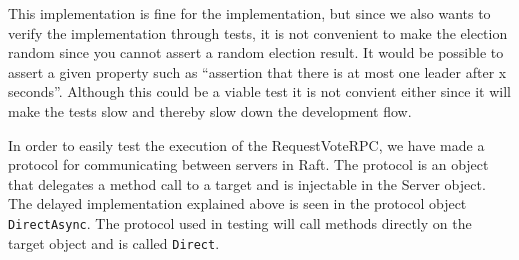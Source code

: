 This implementation is fine for the implementation, but since we also wants to verify the implementation through tests, it is not convenient to make the election random since you cannot assert a random election result. It would be possible to assert a given property such as ``assertion that there is at most one leader after x seconds''. Although this could be a viable test it is not convient either since it will make the tests slow and thereby slow down the development flow.

In order to easily test the execution of the RequestVoteRPC, we have made a protocol for communicating between servers in Raft. The protocol is an object that delegates a method call to a target and is injectable in the Server object. The delayed implementation explained above is seen in the protocol object \verb$DirectAsync$. The protocol used in testing will call methods directly on the target object and is called \verb$Direct$.


%

